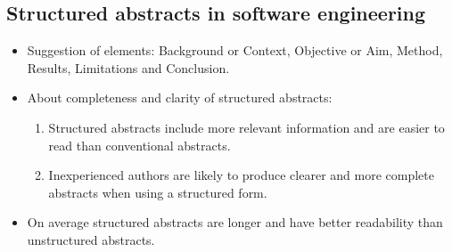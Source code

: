 \newpage
\subsection{Structured abstracts in software engineering}

\begin{itemize}
\item Suggestion of elements: Background or Context, Objective or Aim, Method, Results, Limitations and Conclusion. \cite{Jedlitschka2008} \cite{Jedlitschka2005}
\item About completeness and clarity of structured abstracts:
	\begin{enumerate}
	\item Structured abstracts include more relevant information and are easier to read than conventional abstracts. \cite{Budgen2008} \cite{Budgen2007}
	\item Inexperienced authors are likely to produce clearer and more complete abstracts when using a structured form.\cite{Budgen2011} 
	\end{enumerate}
\item On average structured abstracts are longer and have better readability than unstructured abstracts. \cite{KBO2008}
\end{itemize}





